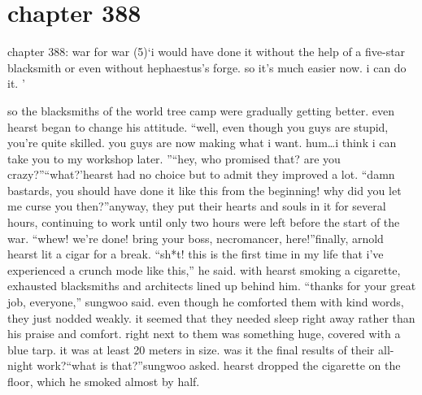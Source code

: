 \section{chapter 388}

chapter 388: war for war (5)‘i would have done it without the help of a five-star blacksmith or even without hephaestus’s forge.
 so it’s much easier now.
 i can do it.
’




so the blacksmiths of the world tree camp were gradually getting better.
even hearst began to change his attitude.
“well, even though you guys are stupid, you’re quite skilled.
 you guys are now making what i want.
 hum…i think i can take you to my workshop later.
”“hey, who promised that? are you crazy?”“what?’hearst had no choice but to admit they improved a lot.
“damn bastards, you should have done it like this from the beginning! why did you let me curse you then?”anyway, they put their hearts and souls in it for several hours, continuing to work until only two hours were left before the start of the war.
“whew! we’re done! bring your boss, necromancer, here!”finally, arnold hearst lit a cigar for a break.
“sh*t! this is the first time in my life that i’ve experienced a crunch mode like this,” he said.
with hearst smoking a cigarette, exhausted blacksmiths and architects lined up behind him.
“thanks for your great job, everyone,” sungwoo said.
even though he comforted them with kind words, they just nodded weakly.
 it seemed that they needed sleep right away rather than his praise and comfort.
right next to them was something huge, covered with a blue tarp.
 it was at least 20 meters in size.
 was it the final results of their all-night work?“what is that?”sungwoo asked.
hearst dropped the cigarette on the floor, which he smoked almost by half.

